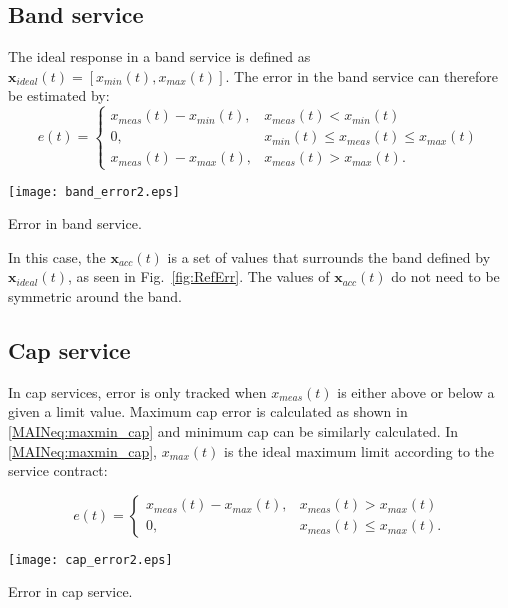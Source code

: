 \subsection*{Band service}
The ideal response in a band service is defined as $ \mathbf{x}_{ideal}(t)= [x_{min}(t),x_{max}(t)]$. The error in the band service can therefore be estimated by:
\begin{equation}\label{MAINeq:band_error}
e(t)=
\begin{cases}
x_{meas}(t) - x_{min}(t) , & x_{meas}(t) < x_{min}(t)  \\
0, & x_{min}(t) \leq x_{meas}(t) \leq x_{max}(t) \\
x_{meas}(t) - x_{max}(t), & x_{meas}(t)  > x_{max}(t).  
\end{cases}
\end{equation}
\begin{marginfigure}
	\texttt{[image: band\_error2.eps]}
	\caption{Error in band service.}
      \label{fig:banderrorMAIN}
\end{marginfigure}

In this case, the $\mathbf{x}_{acc}(t)$ is a set of values that surrounds the band defined by $ \mathbf{x}_{ideal}(t)$, as seen in Fig.~\ref{fig:RefErr}. The values of $\mathbf{x}_{acc}(t)$ do not need to be symmetric around the band.

\subsection*{Cap service}
In cap services, error is only tracked when $x_{meas}(t)$ is either above or below a given a limit value.
Maximum cap error is calculated as shown in \eqref{MAINeq:maxmin_cap} and minimum cap can be similarly calculated. In \eqref{MAINeq:maxmin_cap}, $x_{max}(t)$ is the ideal maximum limit according to the service contract:

\begin{equation}\label{MAINeq:maxmin_cap}
e(t)=
\begin{cases}
x_{meas}(t)-x_{max}(t), & x_{meas}(t) > x_{max}(t) \\
0, & x_{meas}(t) \leq x_{max}(t).
\end{cases}
\end{equation}
\begin{marginfigure}
	\texttt{[image: cap\_error2.eps]}
	\caption{Error in cap service.}
      \label{fig:caperrorMAIN}
\end{marginfigure}

